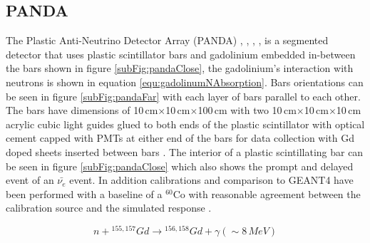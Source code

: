 \subsection{PANDA}
The Plastic Anti-Neutrino Detector Array (PANDA) \cite{PANDA_2012}, \cite{PANDA_2014}, \cite{PANDA_tgf}, \cite{IIRIE_Panda_2021}, is a segmented detector that uses plastic scintillator bars and gadolinium embedded in-between the bars shown in figure \ref{subFig:pandaClose}, the gadolinium's interaction with neutrons is shown in equation \ref{equ:gadolinumNAbsorption}. Bars orientations can be seen in figure \ref{subFig:pandaFar} with each layer of bars parallel to each other. The bars have dimensions of 10\,cm$\times$10\,cm$\times$100\,cm with two 10\,cm$\times$10\,cm$\times$10\,cm acrylic cubic light guides glued to both ends of the plastic scintillator with optical cement capped with PMTs at either end of the bars for data collection with Gd doped sheets inserted between bars \cite{PANDA_2014}. The interior of a plastic scintillating bar can be seen in figure \ref{subFig:pandaClose} which also shows the prompt and delayed event of an $\bar{\nu_e}$ event. In addition calibrations and comparison to GEANT4 \cite{Agostinelli:2002hh} have been performed with a baseline of a $^{60}$Co with reasonable agreement between the calibration source and the simulated response \cite{PANDA_2012}. 

\begin{equation}
n + {^{155,157}Gd} \rightarrow {^{156,158} Gd} + \gamma (\sim 8\,MeV)
\label{equ:gadolinumNAbsorption}
\end{equation}


